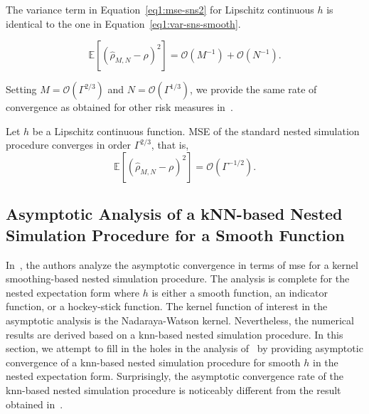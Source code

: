 The variance term in Equation~\eqref{eq1:mse-sns2} for Lipschitz continuous $h$ is identical to the one in Equation~\eqref{eq1:var-sns-smooth}.

\begin{equation}
    \mathbb{E} \left[ \left( \hat{\rho}_{M, N} - \rho \right)^2 \right] = \mathcal{O}(M^{-1}) + \mathcal{O}(N^{-1}).
\end{equation}

Setting $M = \mathcal{O}(\Gamma^{2/3})$ and $N = \mathcal{O}(\Gamma^{1/3})$, we provide the same rate of convergence as obtained for other risk measures in~\cite{gordy2010nested}.

\begin{theorem}
    Let $h$ be a Lipschitz continuous function. 
    MSE of the standard nested simulation procedure converges in order $\Gamma^{2/3}$, that is,
    $$\mathbb{E} \left[ \left( \hat{\rho}_{M, N} - \rho \right)^2 \right] = \mathcal{O}(\Gamma^{-1/2}).$$
\end{theorem}

\subsection{Asymptotic Analysis of a kNN-based Nested Simulation Procedure for a Smooth Function}

In~\cite{hong2017kernel}, the authors analyze the asymptotic convergence in terms of \gls{mse} for a kernel smoothing-based nested simulation procedure.
The analysis is complete for the nested expectation form where $h$ is either a smooth function, an indicator function, or a hockey-stick function.
The kernel function of interest in the asymptotic analysis is the Nadaraya-Watson kernel.
Nevertheless, the numerical results are derived based on a \gls{knn}-based nested simulation procedure.
In this section, we attempt to fill in the holes in the analysis of~\cite{hong2017kernel} by providing asymptotic convergence of a \gls{knn}-based nested simulation procedure for smooth $h$ in the nested expectation form.
Surprisingly, the asymptotic convergence rate of the \gls{knn}-based nested simulation procedure is noticeably different from the result obtained in~\cite{hong2017kernel}.

